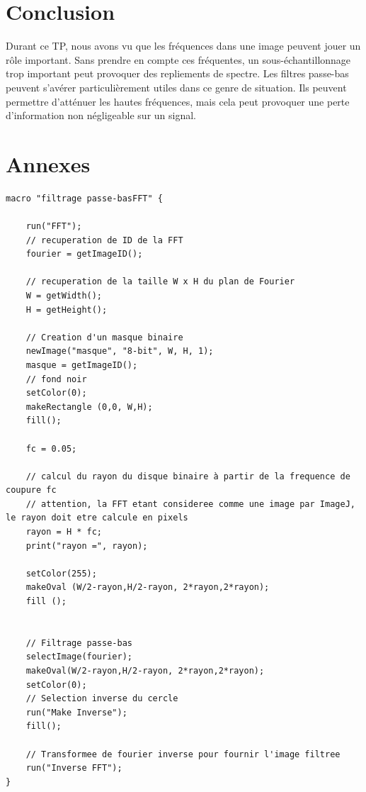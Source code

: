 \documentclass[a4paper,11pt]{article}
\begin{document}
  \section*{Conclusion}
  Durant ce TP, nous avons vu que les fréquences dans une image peuvent jouer un rôle important. 
  Sans prendre en compte ces fréquentes, un sous-échantillonnage trop important peut 
  provoquer des repliements de spectre. Les filtres passe-bas peuvent s'avérer
  particulièrement utiles dans ce genre de situation. Ils peuvent permettre d'atténuer 
  les hautes fréquences, mais cela peut provoquer une perte d'information non 
  négligeable sur un signal.\\
  
  \newpage
  \section{Annexes}
  \begin{lstlisting}[caption=Macro d'atténuation du phénomène de moiré]
macro "filtrage passe-basFFT" {

    run("FFT");
    // recuperation de ID de la FFT
    fourier = getImageID();

    // recuperation de la taille W x H du plan de Fourier
    W = getWidth();
    H = getHeight();

    // Creation d'un masque binaire
    newImage("masque", "8-bit", W, H, 1);
    masque = getImageID();
    // fond noir
    setColor(0);
    makeRectangle (0,0, W,H);
    fill();

    fc = 0.05;

    // calcul du rayon du disque binaire à partir de la frequence de coupure fc
    // attention, la FFT etant consideree comme une image par ImageJ, le rayon doit etre calcule en pixels
    rayon = H * fc;
    print("rayon =", rayon);

    setColor(255);
    makeOval (W/2-rayon,H/2-rayon, 2*rayon,2*rayon);
    fill ();


    // Filtrage passe-bas
    selectImage(fourier);
    makeOval(W/2-rayon,H/2-rayon, 2*rayon,2*rayon);
    setColor(0);
    // Selection inverse du cercle
    run("Make Inverse");
    fill();

    // Transformee de fourier inverse pour fournir l'image filtree
    run("Inverse FFT");
}
  \end{lstlisting}
\end{document}
